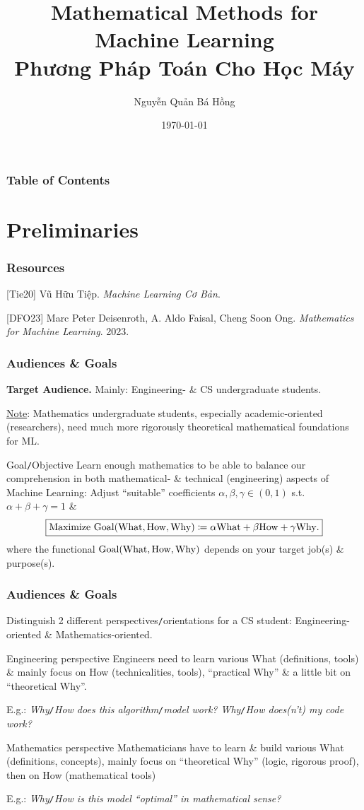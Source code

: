 \documentclass{beamer}
\title{Mathematical Methods for Machine Learning\\Phương Pháp Toán Cho Học Máy}
\author{\sc Nguyễn Quản Bá Hồng}
\institute{UMT, HCMC -- University of Management \& Technology, Ho Chi Minh City}
\date{\today}
\begin{document}
\frame{\titlepage}
\begin{frame}
	\frametitle{Table of Contents}
	\tableofcontents
\end{frame}

\section{Preliminaries}

\begin{frame}
	\frametitle{Resources}
	[Tie20] {\sc Vũ Hữu Tiệp}. {\it Machine Learning Cơ Bản}.
	\vspace{2mm}
	
	[DFO23] {\sc Marc Peter Deisenroth, A. Aldo Faisal, Cheng Soon Ong}. {\it Mathematics for Machine Learning}. 2023.
\end{frame}

\begin{frame}
	\frametitle{Audiences \& Goals}
	{\bf Target Audience.} Mainly: Engineering- \& CS undergraduate students.
	
	\underline{Note}: Mathematics undergraduate students, especially academic-oriented (researchers), need much more rigorously theoretical mathematical foundations for ML.	
	\begin{block}{Goal{\tt/}Objective}
		Learn enough mathematics to be able to balance our comprehension in both mathematical- \& technical (engineering) aspects of Machine Learning: Adjust ``suitable'' coefficients $\alpha,\beta,\gamma\in(0,1)$ s.t. $\alpha + \beta + \gamma = 1$ \&
		\begin{equation}
			 \boxed{\mbox{Maximize } {\rm Goal}({\rm What,How,Why})\coloneqq\alpha{\rm What} + \beta{\rm How} + \gamma{\rm Why}.}
		\end{equation}
		where the functional ${\rm Goal}({\rm What,How,Why})$ depends on your target job(s) \& purpose(s).
	\end{block}
\end{frame}

\begin{frame}
	\frametitle{Audiences \& Goals}
	Distinguish 2 different perspectives{\tt/}orientations for a CS student: Engineering-oriented \& Mathematics-oriented.
	\begin{block}{Engineering perspective}
		Engineers need to learn various What (definitions, tools) \& mainly focus on How (technicalities, tools), ``practical Why'' \& a little bit on ``theoretical Why''.
	\end{block}
	E.g.: {\it Why{\tt/}How does this algorithm{\tt/}model work? Why{\tt/}How does(n't) my code work?}
	
	\begin{block}{Mathematics perspective}
		Mathematicians have to learn \& build various What (definitions, concepts), mainly focus on ``theoretical Why'' (logic, rigorous proof), then on How (mathematical tools)
	\end{block}
	E.g.: {\it Why{\tt/}How is this model ``optimal'' in mathematical sense?}
\end{frame}
\end{document}
